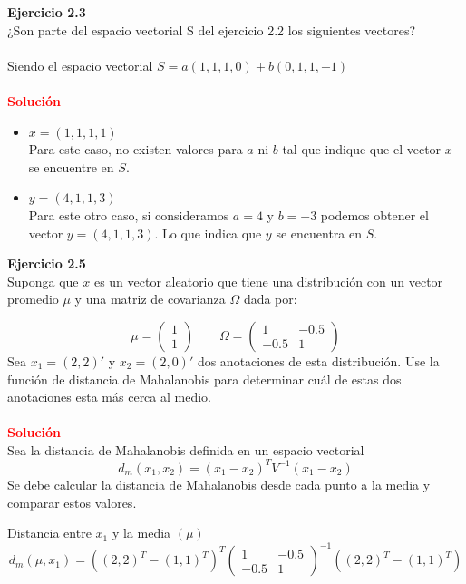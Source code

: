 \documentclass[12pt]{article}
\begin{document}
\noindent \textbf{Ejercicio 2.3}\\
¿Son parte del espacio vectorial S del ejercicio 2.2 los siguientes vectores?\\
\\
Siendo el espacio vectorial $S={a(1,1,1,0) + b(0,1,1,-1)}$\\
\\
\noindent \textcolor{red}{\bf Soluci\'on}
\begin{itemize}
    \item $x= (1,1,1,1) $\\
    Para este caso, no existen valores para $a$ ni $b$ tal que indique que el vector $x$ se encuentre en $S$.
    \\
    \item $y= (4,1,1,3) $\\
     Para este otro caso, si consideramos $a=4$ y $b=-3$ podemos obtener el vector $y=(4,1,1,3)$. Lo que indica que $y$ se encuentra en $S$.
    
\end{itemize}

\noindent \textbf{Ejercicio 2.5}\\
Suponga que $x$ es un vector aleatorio que tiene una distribución con un vector promedio $\mu$ y una matriz de covarianza $\Omega$ dada por:

\[
	\mu = 
	\begin{pmatrix}
    	1 \\
   		1
  	\end{pmatrix}\qquad
  	\Omega =
  	\begin{pmatrix}
  		1 & -0.5\\
  		-0.5 & 1
  	\end{pmatrix}  	  	  	
\]
Sea $x_1 = (2, 2)'$  y $x_2 = (2, 0)'$ dos anotaciones de esta distribución.
Use la función de distancia de Mahalanobis para determinar cuál de estas dos anotaciones esta más cerca al medio.
\\\\
\noindent \textcolor{red}{\bf Soluci\'on}\\
Sea la distancia de Mahalanobis definida en un espacio vectorial
\[
	d_{m}(x_1,x_2) = (x_1-x_2)^{T}V^{-1}(x_1-x_2)
\]
Se debe calcular la distancia de Mahalanobis desde cada punto a la media y comparar estos valores.

Distancia entre $x_1$ y la media $(\mu)$
\[
	d_{m}(\mu,x_1) = ((2, 2)^T-(1, 1)^T)^{T}{\begin{pmatrix}
	1 & -0.5\\
	-0.5 & 1
	\end{pmatrix}}^{-1}((2, 2)^T-(1, 1)^T)
\]
\end{document}
